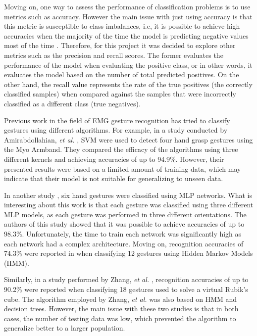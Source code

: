 \documentclass[journal]{IEEEtran}
\newcommand{\etal}{\emph{et al.}}
\begin{document}
Moving on, one way to assess the performance of classification problems is to use metrics such as accuracy. However the main issue with just using accuracy is that this metric is susceptible to class imbalances, i.e, it is possible to achieve high accuracies when the majority of the time the model is predicting negative values most of the time \cite{juba2019}. Therefore, for this project it was decided to explore other metrics such as the precision and recall scores. The former evaluates the performance of the model when evaluating the positive class, or in other words, it evaluates the model based on the number of total predicted positives. On the other hand, the recall value represents the rate of the true positives (the correctly classified samples) when compared against the samples that were incorrectly classified as a different class (true negatives).

Previous work in the field of EMG gesture recognition has tried to classify gestures using different algorithms. For example, in a study conducted by Amirabdollahian, \etal{} \cite{amirabdollahian2017}, SVM were used to detect four hand grasp gestures using the Myo Armband. They compared the efficacy of the algorithms using three different kernels and achieving accuracies of up to 94.9\%. However, their presented results were based on a limited amount of training data, which may indicate that their model is not suitable for generalizing to unseen data. 

In another study \cite{lima2018}, six hand gestures were classified using MLP networks. What is interesting about this work is that each gesture was classified using three different MLP models, as each gesture was performed in three different orientations. The authors of this study showed that it was possible to achieve accuracies of up to 98.3\%. Unfortunately, the time to train each network was significantly high as each network had a complex architecture. Moving on, recognition accuracies of 74.3\% were reported in \cite{georgi2015} when classifying 12 gestures using Hidden Markov Models (HMM). 

Similarly, in a study performed by Zhang, \etal{} \cite{zhang2011}, recognition accuracies of up to 90.2\% were reported when classifying 18 gestures used to solve a virtual Rubik’s cube. The algorithm employed by Zhang, \etal{} was also based on HMM and decision trees. However, the main issue with these two studies is that in both cases, the number of testing data was low, which prevented the algorithm to generalize better to a larger population. 
\end{document}
